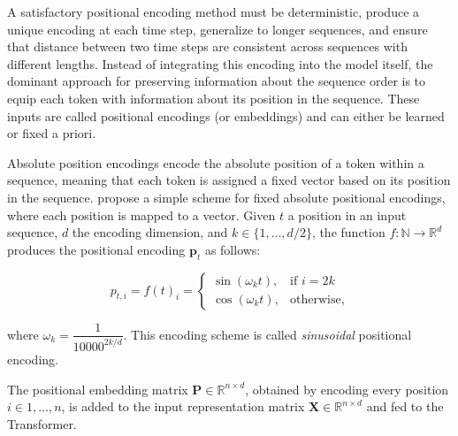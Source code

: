 A satisfactory positional encoding method must be deterministic, produce a unique encoding at each time step, generalize to longer sequences, and ensure that distance between two time steps are consistent across sequences with different lengths. Instead of integrating this encoding into the model itself, the dominant approach for preserving information about the sequence order is to equip each token with information about its position in the sequence. These inputs are called positional encodings (or embeddings) and can either be learned or fixed a priori. %

Absolute position encodings encode the absolute position of a token within a sequence, meaning that each token is assigned a fixed vector based on its position in the sequence. \citet{vaswani2017attention} propose a simple scheme for fixed absolute positional encodings, where each position is mapped to a vector. Given $t$ a position in an input sequence, $d$ the encoding dimension, and $k \in \{1, \ldots, d/2\}$, the function $f: \mathbb{N} \rightarrow \mathbb{R}^d$ produces the positional encoding $\bm{p}_t$ as follows:

\begin{equation}
    p_{t,i} = f(t)_i = 
\begin{cases}
    \sin(\omega_k t), & \text{if } i=2k\\
    \cos(\omega_k t),              & \text{otherwise},
\end{cases}
\end{equation}

where $\omega_k =\dfrac{1}{10000^{2k/d}}$. This encoding scheme is called \textit{sinusoidal} positional encoding.

The positional embedding matrix $\bm{P} \in \mathbb{R}^{n \times d}$, obtained by encoding every position $i \in {1, \ldots, n}$, is added to the input representation matrix $\bm{X} \in \mathbb{R}^{n \times d}$ and fed to the Transformer.



